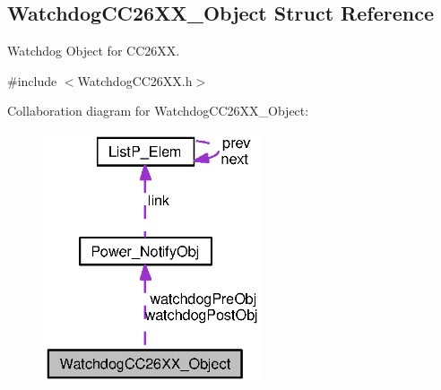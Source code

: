 \subsection{Watchdog\+C\+C26\+X\+X\+\_\+\+Object Struct Reference}
\label{struct_watchdog_c_c26_x_x___object}


Watchdog Object for C\+C26\+X\+X.  




{\ttfamily \#include $<$Watchdog\+C\+C26\+X\+X.\+h$>$}



Collaboration diagram for Watchdog\+C\+C26\+X\+X\+\_\+\+Object\+:
\nopagebreak
\begin{figure}[H]
\begin{center}
\leavevmode
\includegraphics[width=182pt]{struct_watchdog_c_c26_x_x___object__coll__graph}
\end{center}
\end{figure}
